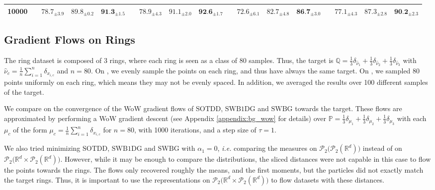 \documentclass[twoside]{article}
\newcommand{\cP}{\mathcal{P}}
\newcommand{\bP}{\mathbb{P}}
\newcommand{\bQ}{\mathbb{Q}}
\newcommand{\cPP}[1]{\mathcal{P}_2\big(\cP_2(#1)\big)}
\newcommand{\cPProd}[1]{\mathcal{P}_2\big(#1 \times \cP_2(#1)\big)}
\newcommand{\sotdd}{\mathrm{SOTDD}}
\newcommand{\R}{\mathbb{R}}
\newcommand{\swbdg}{\mathrm{SWB1DG}}
\newcommand{\swbg}{\mathrm{SWBG}}
\begin{document}
\begin{table}[t]
{\begin{tabular}{ccccccccccccccccc}
             10000 & & $78.7_{\pm 3.9}$ & $89.8_{\pm 0.2}$ & $\textbf{91.3}_{\pm 1.5}$ & & $78.9_{\pm 4.3}$ & $91.1_{\pm 2.0}$ & $\textbf{92.6}_{\pm 1.7}$ & & $72.6_{\pm 6.1}$ & $82.7_{\pm 4.8}$ & $\textbf{86.7}_{\pm 3.0}$ & & $77.1_{\pm 4.3}$ & $87.3_{\pm 2.8}$ & $\textbf{90.2}_{\pm 2.3}$ \\
             \bottomrule
        \end{tabular}
    }
    \label{tab:projs_vs_corr}
\end{table}






\subsection{Gradient Flows on Rings} \label{appendix:rings}


The ring dataset is composed of 3 rings, where each ring is seen as a class of 80 samples. Thus, the target is $\bQ=\frac13 \delta_{\hat{\nu}_1} + \frac13\delta_{\hat{\nu}_2}+\frac13\delta_{\hat{\nu}_3}$ with $\hat{\nu}_c = \frac{1}{n}\sum_{i=1}^n \delta_{x_{i,c}}$ and $n=80$. On , we evenly sample the points on each ring, and thus have always the same target. On , we sampled 80 points uniformly on each ring, which means they may not be evenly spaced. In addition, we averaged the results over 100 different samples of the target.

We compare on  the convergence of the WoW gradient flows of $\sotdd$, $\swbdg$ and $\swbg$ towards the target. These flows are approximated by performing a WoW gradient descent (see Appendix \ref{appendix:bg_wow} for details) over $\bP=\frac13\delta_{\mu_1}+\frac13\delta_{\mu_2}+\frac13\delta_{\mu_3}$ with each $\mu_c$ of the form $\mu_c=\frac1n\sum_{i=1}^n \delta_{x_{i,c}}$ for $n=80$, with 1000 iterations, and a step size of $\tau=1$.

We also tried minimizing $\sotdd$, $\swbdg$ and $\swbg$ with $\alpha_1=0$, \emph{i.e.} comparing the measures on $\cPP{\R^d}$ instead of on $\cPProd{\R^d}$. However, while it may be enough to compare the distributions, the sliced distances were not capable in this case to flow the points towards the rings. The flows only recovered roughly the means, and the first moments, but the particles did not exactly match the target rings. Thus, it is important to use the representations on $\cPProd{\R^d}$ to flow datasets with these distances.
\end{document}
